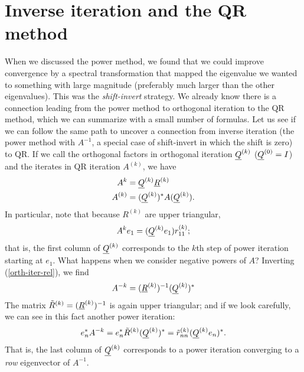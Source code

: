 \section{Inverse iteration and the QR method}

When we discussed the power method, we found that we could improve
convergence by a spectral transformation that mapped the eigenvalue we
wanted to something with large magnitude (preferably much larger than
the other eigenvalues).  This was the {\em shift-invert} strategy.
We already know there is a connection leading from the power method
to orthogonal iteration to the QR method, which we can summarize with
a small number of formulas.  Let us see if we can follow the same
path to uncover a connection from inverse iteration (the power method
with $A^{-1}$, a special case of shift-invert in which the shift is zero) to QR.
If we call the orthogonal factors
in orthogonal iteration  $\underline{Q}^{(k)}$ ($\underline{Q}^{(0)} = I$) and the iterates
in QR iteration $A^{(k)}$, we have
\begin{align}
  A^{k}   &= \underline{Q}^{(k)} \underline{R}^{(k)} \label{orth-iter-rel} \\
  A^{(k)} &= (\underline{Q}^{(k)})^* A (\underline{Q}^{(k)}).
\end{align}
In particular, note that because $R^{(k)}$ are upper triangular,
\[
  A^{k} e_1 = (\underline{Q}^{(k)} e_1) r^{(k)}_{11};
\]
that is, the first column of $\underline{Q}^{(k)}$ corresponds to the $k$th
step of power iteration starting at $e_1$.  What happens when we
consider negative powers of $A$?  Inverting (\ref{orth-iter-rel}),
we find
\[
  A^{-k} = (\underline{R}^{(k)})^{-1} (\underline{Q}^{(k)})^*
\]
The matrix $\tilde{R}^{(k)} = (\underline{R}^{(k)})^{-1}$ is again upper triangular;
and if we look carefully, we can see in this fact another power iteration:
\[
  e_n^* A^{-k} = e_n^* \tilde{R}^{(k)} (\underline{Q}^{(k)})^*
              = \tilde{r}^{(k)}_{nn} (\underline{Q}^{(k)} e_n)^*.
\]
That is, the last column of $\underline{Q}^{(k)}$ corresponds to a power iteration
converging to a {\em row} eigenvector of $A^{-1}$.
